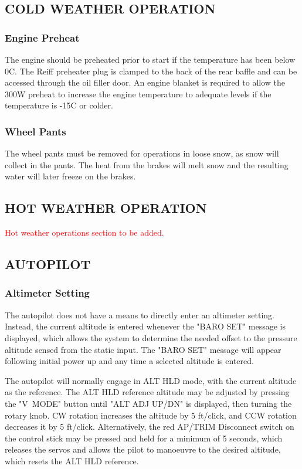 \subsection{COLD WEATHER OPERATION}
\subsubsection{Engine Preheat} The engine should be preheated prior to start if the temperature has been below 0\textdegree C. The Reiff preheater plug is clamped to the back of the rear baffle and can be accessed through the oil filler door. An engine blanket is required to allow the 300W preheat to increase the engine temperature to adequate levels if the temperature is -15\textdegree C or colder.

\subsubsection{Wheel Pants} The wheel pants must be removed for operations in loose snow, as snow will collect in the pants. The heat from the brakes will melt snow and the resulting water will later freeze on the brakes.

\subsection{HOT WEATHER OPERATION}
\textcolor{red}{Hot weather operations section to be added.}

\subsection{AUTOPILOT}
\subsubsection{Altimeter Setting} The autopilot does not have a means to directly enter an altimeter setting. Instead, the current altitude is entered whenever the "BARO SET" message is displayed, which allows the system to determine the needed offset to the pressure altitude sensed from the static input. The "BARO SET" message will appear following initial power up and any time a selected altitude is entered.

The autopilot will normally engage in ALT HLD mode, with the current altitude as the reference. The ALT HLD reference altitude may be adjusted by pressing the "V~MODE" button until "ALT ADJ UP/DN" is displayed, then turning the rotary knob. CW rotation increases the altitude by 5 ft/click, and CCW rotation decreases it by 5 ft/click. Alternatively, the red AP/TRIM Disconnect switch on the control stick may be pressed and held for a minimum of 5 seconds, which releases the servos and allows the pilot to manoeuvre to the desired altitude, which resets the ALT HLD reference.

